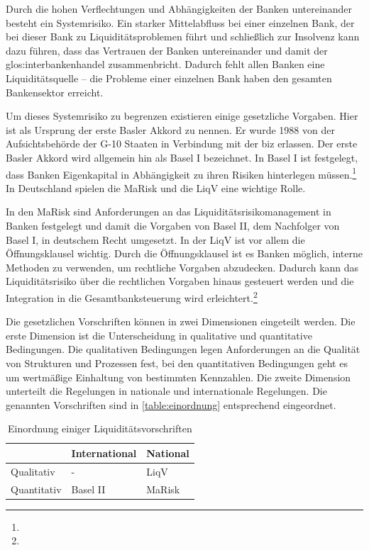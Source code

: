 \begin{onehalfspacing}
Durch die hohen Verflechtungen und Abhängigkeiten der Banken untereinander besteht ein Systemrisiko. Ein starker Mittelabfluss bei einer einzelnen Bank, der bei dieser Bank zu Liquiditätsproblemen führt und schließlich zur Insolvenz kann dazu führen, dass das Vertrauen der Banken untereinander und damit der \gls{glos:interbankenhandel} zusammenbricht. Dadurch fehlt allen Banken eine Liquiditätsquelle -- die Probleme einer einzelnen Bank haben den gesamten Bankensektor erreicht.

Um dieses Systemrisiko zu begrenzen existieren einige gesetzliche Vorgaben. Hier ist als Ursprung der erste Basler Akkord zu nennen. Er wurde 1988 von der Aufsichtsbehörde der G-10 Staaten in Verbindung mit der \gls{biz} erlassen. Der erste Basler Akkord wird allgemein hin als Basel I bezeichnet. In Basel I ist festgelegt, dass Banken Eigenkapital in Abhängigkeit zu ihren Risiken hinterlegen müssen.\footnote{ } In Deutschland spielen die \gls{MaRisk} und die \gls{LiqV} eine wichtige Rolle.

In den \gls{MaRisk} sind Anforderungen an das Liquiditätsrisikomanagement in Banken festgelegt und damit die Vorgaben von Basel II, dem Nachfolger von Basel I, in deutschem Recht umgesetzt. In der \gls{LiqV} ist vor allem die Öffnungsklausel wichtig. Durch die Öffnungsklausel ist es Banken möglich, interne Methoden zu verwenden, um rechtliche Vorgaben abzudecken. Dadurch kann das Liquiditätsrisiko über die rechtlichen Vorgaben hinaus gesteuert werden und die Integration in die Gesamtbanksteuerung wird erleichtert.\footnote{ }

Die gesetzlichen Vorschriften können in zwei Dimensionen eingeteilt werden. Die erste Dimension ist die Unterscheidung in qualitative und quantitative Bedingungen. Die qualitativen Bedingungen legen Anforderungen an die Qualität von Strukturen und Prozessen fest, bei den quantitativen Bedingungen geht es um wertmäßige Einhaltung von bestimmten Kennzahlen. Die zweite Dimension unterteilt die Regelungen in nationale und internationale Regelungen. Die genannten Vorschriften sind in \vref{table:einordnung} entsprechend eingeordnet.

{
\setlength{\extrarowheight}{2pt}
\begin{table}[h]
\centering
\begin{tabular}{| l | >{\centering\arraybackslash} m{4cm} | >{\centering\arraybackslash} m{4cm} |}
\cline{2-3}
\multicolumn{1}{l|}{}	& International & National 		\\	\hline
Qualitativ 				& - 			& \gls{LiqV}	\\	\hline
Quantitativ 			& Basel II 		& \gls{MaRisk}	\\	\hline
\end{tabular} 
\caption{Einordnung einiger Liquiditätsvorschriften \label{table:einordnung}}
\end{table}
}


\end{onehalfspacing}
